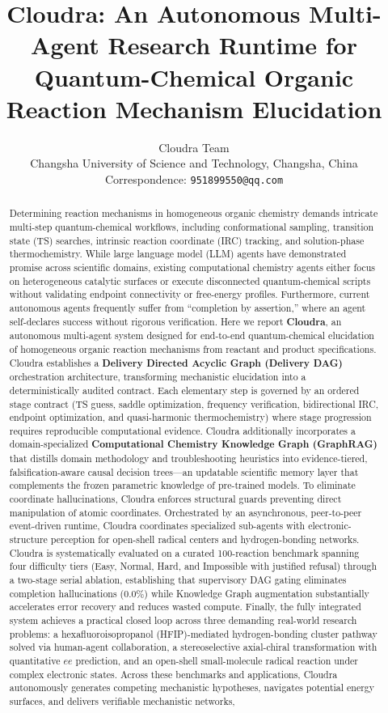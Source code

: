 \documentclass[10pt,twocolumn,letterpaper]{article}
\title{\textbf{Cloudra: An Autonomous Multi-Agent Research Runtime for Quantum-Chemical Organic Reaction Mechanism Elucidation}}
\author{
    Cloudra Team \\
    \small Changsha University of Science and Technology, Changsha, China \\
    \small Correspondence: \texttt{951899550@qq.com}
}
\date{}
\begin{document}
\maketitle

\begin{abstract}
Determining reaction mechanisms in homogeneous organic chemistry demands intricate multi-step quantum-chemical workflows, including conformational sampling, transition state (TS) searches, intrinsic reaction coordinate (IRC) tracking, and solution-phase thermochemistry. While large language model (LLM) agents have demonstrated promise across scientific domains, existing computational chemistry agents either focus on heterogeneous catalytic surfaces or execute disconnected quantum-chemical scripts without validating endpoint connectivity or free-energy profiles. Furthermore, current autonomous agents frequently suffer from ``completion by assertion,'' where an agent self-declares success without rigorous verification. Here we report \textbf{Cloudra}, an autonomous multi-agent system designed for end-to-end quantum-chemical elucidation of homogeneous organic reaction mechanisms from reactant and product specifications. Cloudra establishes a \textbf{Delivery Directed Acyclic Graph (Delivery DAG)} orchestration architecture, transforming mechanistic elucidation into a deterministically audited contract. Each elementary step is governed by an ordered stage contract (TS guess, saddle optimization, frequency verification, bidirectional IRC, endpoint optimization, and quasi-harmonic thermochemistry) where stage progression requires reproducible computational evidence. Cloudra additionally incorporates a domain-specialized \textbf{Computational Chemistry Knowledge Graph (GraphRAG)} that distills domain methodology and troubleshooting heuristics into evidence-tiered, falsification-aware causal decision trees---an updatable scientific memory layer that complements the frozen parametric knowledge of pre-trained models. To eliminate coordinate hallucinations, Cloudra enforces structural guards preventing direct manipulation of atomic coordinates. Orchestrated by an asynchronous, peer-to-peer event-driven runtime, Cloudra coordinates specialized sub-agents with electronic-structure perception for open-shell radical centers and hydrogen-bonding networks. Cloudra is systematically evaluated on a curated 100-reaction benchmark spanning four difficulty tiers (Easy, Normal, Hard, and Impossible with justified refusal) through a two-stage serial ablation, establishing that supervisory DAG gating eliminates completion hallucinations ($0.0\%$) while Knowledge Graph augmentation substantially accelerates error recovery and reduces wasted compute. Finally, the fully integrated system achieves a practical closed loop across three demanding real-world research problems: a hexafluoroisopropanol (HFIP)-mediated hydrogen-bonding cluster pathway solved via human-agent collaboration, a stereoselective axial-chiral transformation with quantitative $ee$ prediction, and an open-shell small-molecule radical reaction under complex electronic states. Across these benchmarks and applications, Cloudra autonomously generates competing mechanistic hypotheses, navigates potential energy surfaces, and delivers verifiable mechanistic networks, 
\end{abstract}
\end{document}
